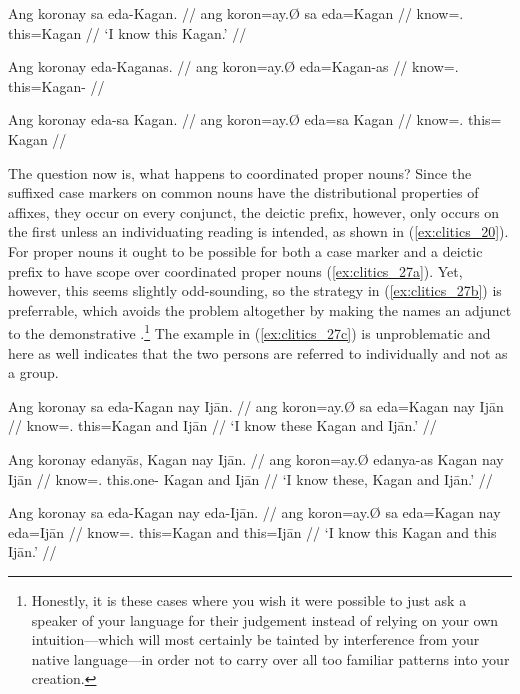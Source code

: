 \pex\label{ex:clitics_26}
\a\label{ex:clitics_26a}\begingl
	\gla Ang koronay sa eda-Kagan. //
	\glb ang koron=ay.Ø sa eda=Kagan //
	\glc \AgtT{} know=\Fsg{}.\Top{} \Parg{} this=Kagan //
	\glft `I know this Kagan.' //
\endgl

\a\label{ex:clitics_26b}\ljudge{*}\begingl
	\gla Ang koronay eda-Kaganas. //
	\glb ang koron=ay.Ø eda=Kagan-as //
	\glc \AgtT{} know=\Fsg{}.\Top{} this=Kagan-\Parg{} //
\endgl

\a\label{ex:clitics_26c}\ljudge{*}\begingl
	\gla Ang koronay eda-sa Kagan. //
	\glb ang koron=ay.Ø eda=sa Kagan //
	\glc \AgtT{} know=\Fsg{}.\Top{} this=\Parg{} Kagan //
\endgl
\xe

The question now is, what happens to coordinated proper nouns? Since the
suffixed case markers on common nouns have the distributional properties of
affixes, they occur on every conjunct, the deictic prefix, however, only occurs
on the first unless an individuating reading is intended, as shown in 
(\ref{ex:clitics_20}). For proper nouns it ought to be possible for both a case
marker and a deictic prefix to have scope over coordinated proper nouns
(\ref{ex:clitics_27a}). Yet, however, this seems slightly odd-sounding, so the
strategy in (\ref{ex:clitics_27b}) is preferrable, which avoids the problem
altogether by making the names an adjunct to the demonstrative
.\footnote{Honestly, it is these cases
where you wish it were possible to just ask a speaker of your language for
their judgement instead of relying on your own intuition---which will most
certainly be tainted by interference from your native language---in order not
to carry over all too familiar patterns into your creation.} The example in
(\ref{ex:clitics_27c}) is unproblematic and here as well indicates that the two
persons are referred to individually and not as a group.

\pex\label{ex:clitics_27}
\a\label{ex:clitics_27a}\begingl
	\gla Ang koronay sa eda-​Kagan nay Ijān. //
	\glb ang koron=ay.Ø sa eda=Kagan nay Ijān //
	\glc \AgtT{} know=\Fsg{}.\Top{} \Parg{} this=​Kagan and Ijān //
	\glft `I know these Kagan and Ijān.' //
\endgl

\a\label{ex:clitics_27b}\begingl
	\gla Ang koronay edanyās, Kagan nay Ijān. //
	\glb ang koron=ay.Ø edanya-as Kagan nay Ijān //
	\glc \AgtT{} know=\Fsg{}.\Top{} this.one-\Parg{} Kagan and Ijān //
	\glft `I know these, Kagan and Ijān.' //
\endgl

\a\label{ex:clitics_27c}\begingl
	\gla Ang koronay sa eda-​Kagan nay eda-​Ijān. //
	\glb ang koron=ay.Ø sa eda=​Kagan nay eda=Ijān //
	\glc \AgtT{} know=\Fsg{}.\Top{} \Parg{} this=​Kagan and this=​Ijān //
	\glft `I know this Kagan and this Ijān.' //
\endgl
\xe


